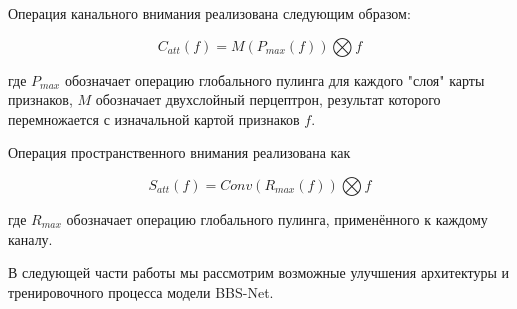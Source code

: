 Операция канального внимания реализована следующим образом:

\begin{equation}
    C_{att}(f)=M(P_{max}(f)) \bigotimes f
\end{equation}

где $P_{max}$ обозначает операцию глобального пулинга для каждого "слоя"
карты признаков, $M$ обозначает двухслойный перцептрон,
результат которого перемножается с изначальной картой признаков $f$.

Операция пространственного внимания реализована как

\begin{equation}
    S_{att}(f)=Conv(R_{max}(f)) \bigotimes f
\end{equation}

где $R_{max}$ обозначает операцию глобального пулинга, применённого к
каждому каналу.

В следующей части работы мы рассмотрим возможные улучшения архитектуры и тренировочного процесса модели BBS-Net.